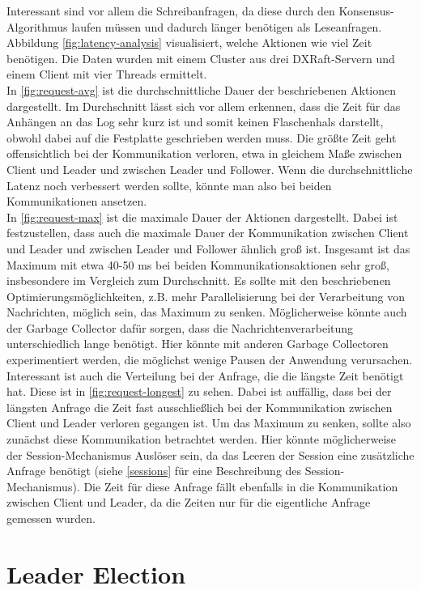 Interessant sind vor allem die Schreibanfragen, da diese durch den Konsensus-Algorithmus laufen müssen und dadurch länger benötigen als Leseanfragen. Abbildung \ref{fig:latency-analysis} visualisiert, welche Aktionen wie viel Zeit benötigen. Die Daten wurden mit einem Cluster aus drei DXRaft-Servern und einem Client mit vier Threads ermittelt. \\
In \ref{fig:request-avg} ist die durchschnittliche Dauer der beschriebenen Aktionen dargestellt. Im Durchschnitt lässt sich vor allem erkennen, dass die Zeit für das Anhängen an das Log sehr kurz ist und somit keinen Flaschenhals darstellt, obwohl dabei auf die Festplatte geschrieben werden muss. Die größte Zeit geht offensichtlich bei der Kommunikation verloren, etwa in gleichem Maße zwischen Client und Leader und zwischen Leader und Follower. Wenn die durchschnittliche Latenz noch verbessert werden sollte, könnte man also bei beiden Kommunikationen ansetzen. \\
In \ref{fig:request-max} ist die maximale Dauer der Aktionen dargestellt. Dabei ist festzustellen, dass auch die maximale Dauer der Kommunikation zwischen Client und Leader und zwischen Leader und Follower ähnlich groß ist. Insgesamt ist das Maximum mit etwa 40-50 ms bei beiden Kommunikationsaktionen sehr groß, insbesondere im Vergleich zum Durchschnitt. Es sollte mit den beschriebenen Optimierungsmöglichkeiten, z.B. mehr Parallelisierung bei der Verarbeitung von Nachrichten, möglich sein, das Maximum zu senken. Möglicherweise könnte auch der Garbage Collector dafür sorgen, dass die Nachrichtenverarbeitung unterschiedlich lange benötigt. Hier könnte mit anderen Garbage Collectoren experimentiert werden, die möglichst wenige Pausen der Anwendung verursachen.
Interessant ist auch die Verteilung bei der Anfrage, die die längste Zeit benötigt hat. Diese ist in \ref{fig:request-longest} zu sehen. Dabei ist auffällig, dass bei der längsten Anfrage die Zeit fast ausschließlich bei der Kommunikation zwischen Client und Leader verloren gegangen ist. Um das Maximum zu senken, sollte also zunächst diese Kommunikation betrachtet werden. Hier könnte möglicherweise der Session-Mechanismus Auslöser sein, da das Leeren der Session eine zusätzliche Anfrage benötigt (siehe \ref{sessions} für eine Beschreibung des Session-Mechanismus). Die Zeit für diese Anfrage fällt ebenfalls in die Kommunikation zwischen Client und Leader, da die Zeiten nur für die eigentliche Anfrage gemessen wurden.

\section{Leader Election}
\label{leader-election}

